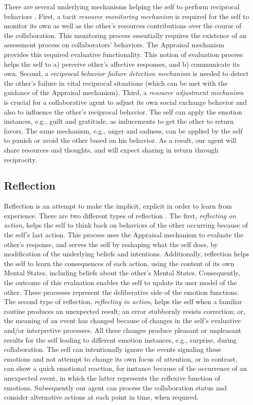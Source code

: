 \documentclass[letterpaper]{article}
\begin{document}
There are several underlying mechanisms helping the self to perform reciprocal
behaviors \cite{cole:reciprocity-collaboration}. First, a tacit \textit{resource
monitoring mechanism} is required for the self to monitor its own as well as the
other's resources contributions over the course of the collaboration. This
monitoring process essentially requires the existence of an assessment process
on collaborators' behaviors. The Appraisal mechanism provides this required
evaluative functionality. This notion of evaluation process helps the self to a)
perceive other's affective responses, and b) communicate its own. Second, a
\textit{reciprocal behavior failure detection mechanism} is needed to detect the
other's failure in vital reciprocal situations (which can be met with the
guidance of the Appraisal mechanism). Third, a \textit{resource adjustment
mechanism} is crucial for a collaborative agent to adjust its own social
exchange behavior and also to influence the other's reciprocal behavior. The
self can apply the emotion instances, e.g., guilt and gratitude, as
inducements to get the other to return favors. The same mechanism, e.g., anger
and sadness, can be applied by the self to punish or avoid the other based on
his behavior. As a result, our agent will share resources and thoughts, and will
expect sharing in return through reciprocity.

\subsection{Reflection} Reflection is an attempt to make the implicit, explicit
in order to learn from experience. There are two different types of reflection
\cite{schon:reflection}. The first, \textit{reflecting on action}, helps the
self to think back on behaviors of the other occurring because of the
self's last action. This process uses the Appraisal mechanism to evaluate the
other's response, and serves the self by reshaping what the self does,
by modification of the underlying beliefs and intentions. Additionally,
reflection helps the self to learn the consequences of each action, using the
content of its own Mental States, including beliefs about the other's
Mental States. Consequently, the outcome of this evaluation enables the self
to update its user model of the other. These processes represent the
deliberative side of the emotion functions. The second type of reflection,
\textit{reflecting in action}, helps the self when a familiar routine produces
an unexpected result; an error stubbornly resists correction; or, the meaning of
an event has changed because of changes in the self's evaluative and/or
interpretive processes. All these changes produce pleasant or unpleasant results
for the self leading to different emotion instances, e.g., surprise, during
collaboration. The self can intentionally ignore the events signaling these
emotions and not attempt to change its own focus of attention, or in contrast,
can show a quick emotional reaction, for instance because of the occurrence of
an unexpected event, in which the latter represents the reflexive function of
emotions. Subsequently our agent can process the collaboration status and
consider alternative actions at each point in time, when required.
\end{document}
